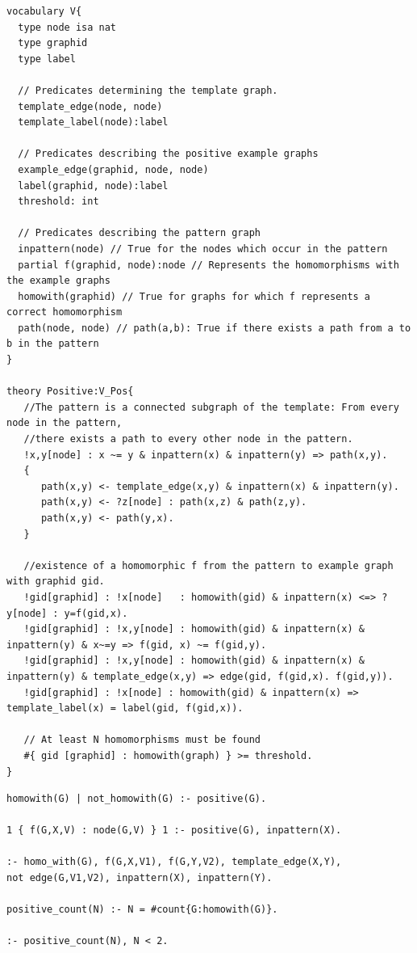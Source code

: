 \begin{lstlisting}[caption=IDP positive constraint, style=model, label=lst:IDPPos]
vocabulary V{
  type node isa nat
  type graphid
  type label

  // Predicates determining the template graph.
  template_edge(node, node) 
  template_label(node):label

  // Predicates describing the positive example graphs
  example_edge(graphid, node, node)
  label(graphid, node):label
  threshold: int

  // Predicates describing the pattern graph
  inpattern(node) // True for the nodes which occur in the pattern
  partial f(graphid, node):node // Represents the homomorphisms with the example graphs
  homowith(graphid) // True for graphs for which f represents a correct homomorphism
  path(node, node) // path(a,b): True if there exists a path from a to b in the pattern
}

theory Positive:V_Pos{
   //The pattern is a connected subgraph of the template: From every node in the pattern, 
   //there exists a path to every other node in the pattern.
   !x,y[node] : x ~= y & inpattern(x) & inpattern(y) => path(x,y).
   {
      path(x,y) <- template_edge(x,y) & inpattern(x) & inpattern(y).
      path(x,y) <- ?z[node] : path(x,z) & path(z,y).
      path(x,y) <- path(y,x).
   }

   //existence of a homomorphic f from the pattern to example graph with graphid gid.
   !gid[graphid] : !x[node]   : homowith(gid) & inpattern(x) <=> ? y[node] : y=f(gid,x).
   !gid[graphid] : !x,y[node] : homowith(gid) & inpattern(x) & inpattern(y) & x~=y => f(gid, x) ~= f(gid,y).
   !gid[graphid] : !x,y[node] : homowith(gid) & inpattern(x) & inpattern(y) & template_edge(x,y) => edge(gid, f(gid,x). f(gid,y)).
   !gid[graphid] : !x[node] : homowith(gid) & inpattern(x) => template_label(x) = label(gid, f(gid,x)).

   // At least N homomorphisms must be found
   #{ gid [graphid] : homowith(graph) } >= threshold.
}
\end{lstlisting}


\lstset{basicstyle=\footnotesize\ttfamily,breaklines=true}
\begin{lstlisting}[caption=ASP positive matching, style=model]
homowith(G) | not_homowith(G) :- positive(G).

1 { f(G,X,V) : node(G,V) } 1 :- positive(G), inpattern(X).

:- homo_with(G), f(G,X,V1), f(G,Y,V2), template_edge(X,Y), 
not edge(G,V1,V2), inpattern(X), inpattern(Y).

positive_count(N) :- N = #count{G:homowith(G)}.

:- positive_count(N), N < 2.
\end{lstlisting}

